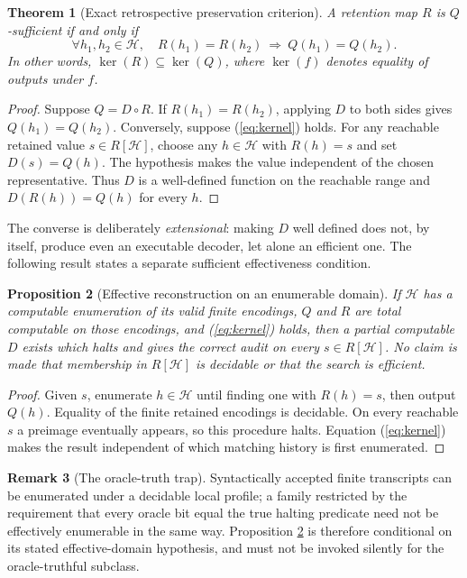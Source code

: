 \documentclass[11pt,letterpaper]{article}
\newtheorem{theorem}{Theorem}[section]
\newtheorem{proposition}[theorem]{Proposition}
\theoremstyle{definition}
\newtheorem{remark}[theorem]{Remark}
\newcommand{\Hh}{\mathcal H}
\begin{document}
\begin{theorem}[Exact retrospective preservation criterion]\label{thm:static}
A retention map $R$ is $Q$-sufficient if and only if
\begin{equation}\label{eq:kernel}
\forall h_1,h_2\in\Hh,\quad R(h_1)=R(h_2)\ \Longrightarrow\ Q(h_1)=Q(h_2).
\end{equation}
In other words, $\ker(R)\subseteq\ker(Q)$, where $\ker(f)$ denotes equality of outputs under $f$.
\end{theorem}
\begin{proof}
Suppose $Q=D\circ R$. If $R(h_1)=R(h_2)$, applying $D$ to both sides gives $Q(h_1)=Q(h_2)$. Conversely, suppose (\ref{eq:kernel}) holds. For any reachable retained value $s\in R[\Hh]$, choose any $h\in\Hh$ with $R(h)=s$ and set $D(s)=Q(h)$. The hypothesis makes the value independent of the chosen representative. Thus $D$ is a well-defined function on the reachable range and $D(R(h))=Q(h)$ for every $h$.
\end{proof}

The converse is deliberately \emph{extensional}: making $D$ well defined does not, by itself, produce even an executable decoder, let alone an efficient one. The following result states a separate sufficient effectiveness condition.

\begin{proposition}[Effective reconstruction on an enumerable domain]\label{prop:effective}
If $\Hh$ has a computable enumeration of its valid finite encodings, $Q$ and $R$ are total computable on those encodings, and (\ref{eq:kernel}) holds, then a partial computable $D$ exists which halts and gives the correct audit on every $s\in R[\Hh]$. No claim is made that membership in $R[\Hh]$ is decidable or that the search is efficient.
\end{proposition}
\begin{proof}
Given $s$, enumerate $h\in\Hh$ until finding one with $R(h)=s$, then output $Q(h)$. Equality of the finite retained encodings is decidable. On every reachable $s$ a preimage eventually appears, so this procedure halts. Equation (\ref{eq:kernel}) makes the result independent of which matching history is first enumerated.
\end{proof}

\begin{remark}[The oracle-truth trap]
Syntactically accepted finite transcripts can be enumerated under a decidable local profile; a family restricted by the requirement that every oracle bit equal the true halting predicate need not be effectively enumerable in the same way. Proposition \ref{prop:effective} is therefore conditional on its stated effective-domain hypothesis, and must not be invoked silently for the oracle-truthful subclass.
\end{remark}
\end{document}
